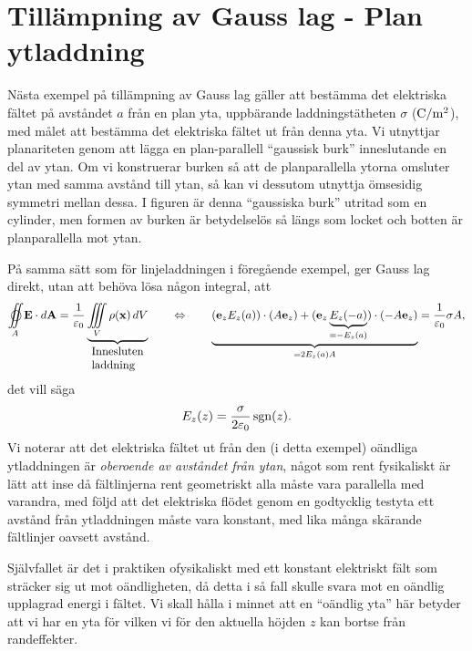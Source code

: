 \section{Till{\"a}mpning av Gauss lag - Plan ytladdning}
N{\"a}sta exempel p{\aa} till{\"a}mpning av Gauss lag g{\"a}ller att best{\"a}mma det elektriska f{\"a}ltet p{\aa} avst{\aa}ndet $a$ fr{\aa}n en plan yta, uppb{\"a}rande laddningst{\"a}theten $\sigma$ (${\rm C}/{\rm m}^2$), med m{\aa}let att best{\"a}mma det elektriska f{\"a}ltet ut fr{\aa}n denna yta. Vi utnyttjar planariteten genom att l{\"a}gga en plan-parallell ``gaussisk burk'' inneslutande en del av ytan. Om vi konstruerar burken s{\aa} att de planparallella ytorna omsluter ytan med samma avst{\aa}nd till ytan, s{\aa} kan vi dessutom utnyttja {\"o}msesidig symmetri mellan dessa.
I figuren {\"a}r denna ``gaussiska burk'' utritad som en cylinder, men formen av burken {\"a}r betydelsel{\"o}s s{\aa} l{\"a}ngs som locket och botten {\"a}r planparallella mot ytan.
\bigskip
\centerline{}
\medskip
\noindent
P{\aa} samma s{\"a}tt som f{\"o}r linjeladdningen i f{\"o}reg{\aa}ende exempel, ger Gauss lag direkt, utan att beh{\"o}va l{\"o}sa n{\aa}gon integral, att
$$
  \oiint_A {\bf E}\cdot d{\bf A}
     ={{1}\over{\varepsilon_0}}
       \underbrace{
         \iiint_V\rho({\bf x})\,dV
       }_{\vbox{\hbox{Innesluten}\hbox{laddning}}}
  \qquad\Leftrightarrow\qquad
  \underbrace{
    ({\bf e}_zE_z(a))\cdot(A{\bf e}_z)
      +({\bf e}_z\underbrace{E_z(-a)}_{=-E_z(a)})\cdot(-A{\bf e}_z)
  }_{=2E_z(a)A}
  = {{1}\over{\varepsilon_0}}\sigma A,
$$
det vill s{\"a}ga
$$
  E_z(z) = {{\sigma}\over{2\varepsilon_0}}\mathop{\rm sgn}\nolimits(z).
$$
Vi noterar att det elektriska f{\"a}ltet ut fr{\aa}n den (i detta exempel) o{\"a}ndliga ytladdningen {\"a}r {\it oberoende av avst{\aa}ndet fr{\aa}n ytan}, n{\aa}got som rent fysikaliskt {\"a}r l{\"a}tt att inse d{\aa} f{\"a}ltlinjerna rent geometriskt alla m{\aa}ste vara parallella med varandra, med f{\"o}ljd att det elektriska fl{\"o}det genom en godtycklig testyta ett avst{\aa}nd fr{\aa}n ytladdningen m{\aa}ste vara konstant, med lika m{\aa}nga sk{\"a}rande f{\"a}ltlinjer oavsett avst{\aa}nd.

Sj{\"a}lvfallet {\"a}r det i praktiken ofysikaliskt med ett konstant elektriskt f{\"a}lt som str{\"a}cker sig ut mot o{\"a}ndligheten, d{\aa} detta i s{\aa} fall skulle svara mot en o{\"a}ndlig upplagrad energi i f{\"a}ltet. Vi skall h{\aa}lla i minnet att en ``o{\"a}ndlig yta'' h{\"a}r betyder att vi har en yta f{\"o}r vilken vi f{\"o}r den aktuella h{\"o}jden $z$ kan bortse fr{\aa}n randeffekter.
\vfill\eject

